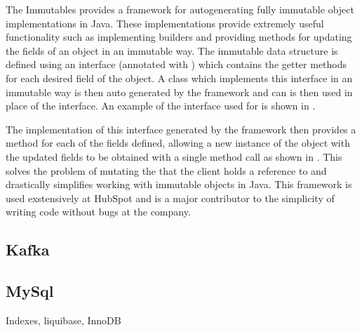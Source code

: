 

The Immutables \cite{immutablesJava} provides a framework for autogenerating fully immutable object implementations in Java. These implementations provide extremely useful functionality such as implementing builders and providing methods for updating the fields of an object in an immutable way. The immutable data structure is defined using an interface (annotated with ) which contains the getter methods for each desired field of the object. A class which implements this interface in an immutable way is then auto generated by the framework and can is then used in place of the interface. An example of the interface used for  is shown in .



The implementation of this interface generated by the framework then provides a  method for each of the fields defined, allowing a new instance of the object with the updated fields to be obtained with a single method call as shown in . This solves the problem of mutating the  that the client holds a reference to and drastically simplifies working with immutable objects in Java. This framework is used exstensively at HubSpot and is a major contributor to the simplicity of writing code without bugs at the company.




\subsection{Kafka}

\subsection{MySql}
Indexes, liquibase, InnoDB

